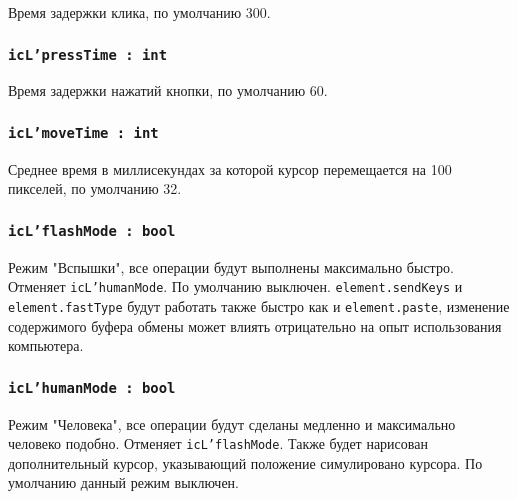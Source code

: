 Время задержки клика, по умолчанию 300.

\subsubsection{\texttt{icL'pressTime : int}}

Время задержки нажатий кнопки, по умолчанию 60.

\subsubsection{\texttt{icL'moveTime : int}}

Среднее время в миллисекундах за которой курсор перемещается на 100 пикселей, по умолчанию 32.

\subsubsection{\texttt{icL'flashMode : bool}}

Режим "Вспышки", все операции будут выполнены максимально быстро. Отменяет \texttt{icL'humanMode}. По умолчанию выключен. \texttt{element.sendKeys} и \texttt{element.fastType} будут работать также быстро как и \texttt{element.paste}, изменение содержимого буфера обмены может влиять отрицательно на опыт использования компьютера.

\subsubsection{\texttt{icL'humanMode : bool}}

Режим "Человека", все операции будут сделаны медленно и максимально человеко подобно. Отменяет \texttt{icL'flashMode}. Также будет нарисован дополнительный курсор, указывающий положение симулировано курсора. По умолчанию данный режим выключен.

